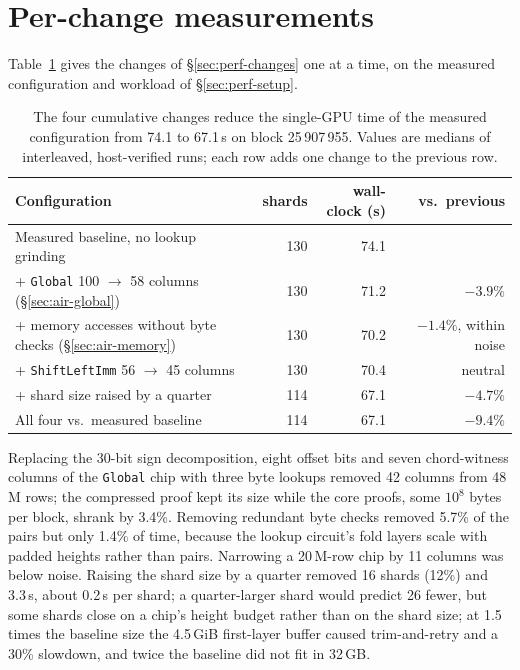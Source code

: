 \section{Per-change measurements}
\label{sec:app-levers}

Table~\ref{tab:levers} gives the changes of \S\ref{sec:perf-changes} one at a time, on the measured configuration and workload of \S\ref{sec:perf-setup}.

\begin{table}[t]
\centering
\caption{The four cumulative changes reduce the single-GPU time of the measured configuration from 74.1 to 67.1\,s on block 25\,907\,955. Values are medians of interleaved, host-verified runs; each row adds one change to the previous row.}
\label{tab:levers}
\begin{tabular}{lrrr}
\toprule
Configuration & shards & wall-clock (s) & vs.\ previous \\
\midrule
Measured baseline, no lookup grinding & 130 & 74.1 & \\
+ \texttt{Global} 100 $\to$ 58 columns (\S\ref{sec:air-global}) & 130 & 71.2 & $-3.9\%$ \\
+ memory accesses without byte checks (\S\ref{sec:air-memory}) & 130 & 70.2 & $-1.4\%$, within noise \\
+ \texttt{ShiftLeftImm} 56 $\to$ 45 columns & 130 & 70.4 & neutral \\
+ shard size raised by a quarter & 114 & 67.1 & $-4.7\%$ \\
\midrule
All four vs.\ measured baseline & 114 & 67.1 & $-9.4\%$ \\
\bottomrule
\end{tabular}
\end{table}

Replacing the 30-bit sign decomposition, eight offset bits and seven chord-witness columns of the \texttt{Global} chip with three byte lookups removed 42 columns from 48\,M rows; the compressed proof kept its size while the core proofs, some $10^{8}$ bytes per block, shrank by 3.4\%. Removing redundant byte checks removed 5.7\% of the \LogUp{} pairs but only 1.4\% of time, because the lookup circuit's fold layers scale with padded heights rather than pairs. Narrowing a 20\,M-row chip by 11 columns was below noise. Raising the shard size by a quarter removed 16 shards (12\%) and 3.3\,s, about 0.2\,s per shard; a quarter-larger shard would predict 26 fewer, but some shards close on a chip's height budget rather than on the shard size; at 1.5 times the baseline size the 4.5\,GiB first-layer \LogUp{} buffer caused trim-and-retry and a 30\% slowdown, and twice the baseline did not fit in 32\,GB.
